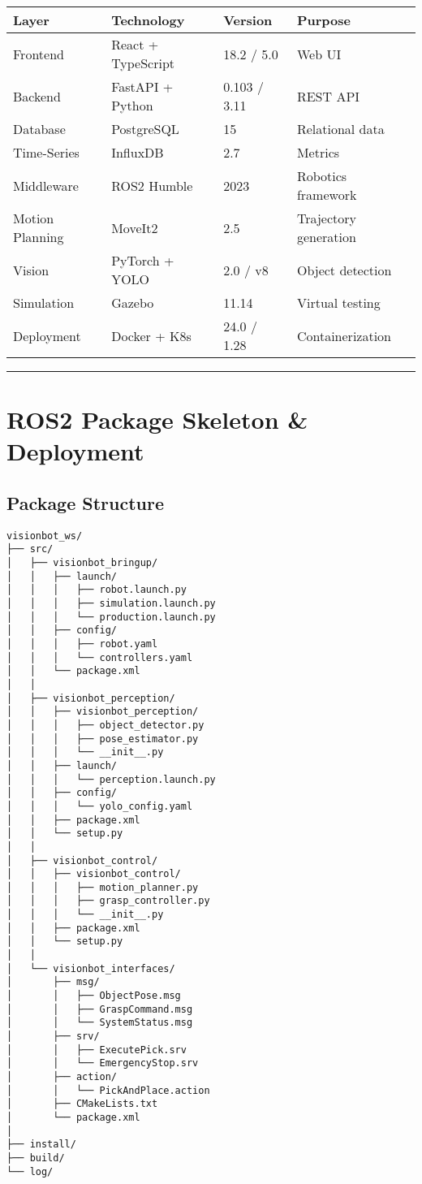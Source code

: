\documentclass[
]{article}
\begin{document}
\begin{longtable}[]{@{}llll@{}}
\toprule\noalign{}
Layer & Technology & Version & Purpose \\
\midrule\noalign{}
\endhead
\bottomrule\noalign{}
\endlastfoot
Frontend & React + TypeScript & 18.2 / 5.0 & Web UI \\
Backend & FastAPI + Python & 0.103 / 3.11 & REST API \\
Database & PostgreSQL & 15 & Relational data \\
Time-Series & InfluxDB & 2.7 & Metrics \\
Middleware & ROS2 Humble & 2023 & Robotics framework \\
Motion Planning & MoveIt2 & 2.5 & Trajectory generation \\
Vision & PyTorch + YOLO & 2.0 / v8 & Object detection \\
Simulation & Gazebo & 11.14 & Virtual testing \\
Deployment & Docker + K8s & 24.0 / 1.28 & Containerization \\
\end{longtable}

\begin{center}\rule{0.5\linewidth}{0.5pt}\end{center}

\hypertarget{ros2-package-skeleton-deployment}{%
\section{ROS2 Package Skeleton \&
Deployment}\label{ros2-package-skeleton-deployment}}

\hypertarget{package-structure}{%
\subsection{Package Structure}\label{package-structure}}

\begin{verbatim}
visionbot_ws/
├── src/
│   ├── visionbot_bringup/
│   │   ├── launch/
│   │   │   ├── robot.launch.py
│   │   │   ├── simulation.launch.py
│   │   │   └── production.launch.py
│   │   ├── config/
│   │   │   ├── robot.yaml
│   │   │   └── controllers.yaml
│   │   └── package.xml
│   │
│   ├── visionbot_perception/
│   │   ├── visionbot_perception/
│   │   │   ├── object_detector.py
│   │   │   ├── pose_estimator.py
│   │   │   └── __init__.py
│   │   ├── launch/
│   │   │   └── perception.launch.py
│   │   ├── config/
│   │   │   └── yolo_config.yaml
│   │   ├── package.xml
│   │   └── setup.py
│   │
│   ├── visionbot_control/
│   │   ├── visionbot_control/
│   │   │   ├── motion_planner.py
│   │   │   ├── grasp_controller.py
│   │   │   └── __init__.py
│   │   ├── package.xml
│   │   └── setup.py
│   │
│   └── visionbot_interfaces/
│       ├── msg/
│       │   ├── ObjectPose.msg
│       │   ├── GraspCommand.msg
│       │   └── SystemStatus.msg
│       ├── srv/
│       │   ├── ExecutePick.srv
│       │   └── EmergencyStop.srv
│       ├── action/
│       │   └── PickAndPlace.action
│       ├── CMakeLists.txt
│       └── package.xml
│
├── install/
├── build/
└── log/
\end{verbatim}
\end{document}
